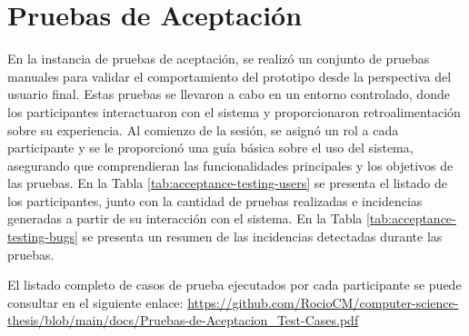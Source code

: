 \section{Pruebas de Aceptación}
\label{sec:acceptance-testing-details}

En la instancia de pruebas de aceptación, se realizó un conjunto de pruebas manuales para validar el comportamiento del prototipo desde la perspectiva del usuario final. Estas pruebas se llevaron a cabo en un entorno controlado, donde los participantes interactuaron con el sistema y proporcionaron retroalimentación sobre su experiencia. Al comienzo de la sesión, se asignó un rol a cada participante y se le proporcionó una guía básica sobre el uso del sistema, asegurando que comprendieran las funcionalidades principales y los objetivos de las pruebas. En la Tabla \ref{tab:acceptance-testing-users} se presenta el listado de los participantes, junto con la cantidad de pruebas realizadas e incidencias generadas a partir de su interacción con el sistema. En la Tabla \ref{tab:acceptance-testing-bugs} se presenta un resumen de las incidencias detectadas durante las pruebas.

El listado completo de casos de prueba ejecutados por cada participante se puede consultar en el siguiente enlace: \href{https://github.com/RocioCM/computer-science-thesis/blob/main/docs/Pruebas-de-Aceptacion_Test-Cases.pdf}{https://github.com/RocioCM/computer-science-thesis/blob/main/docs/Pruebas-de-Aceptacion_Test-Cases.pdf}

